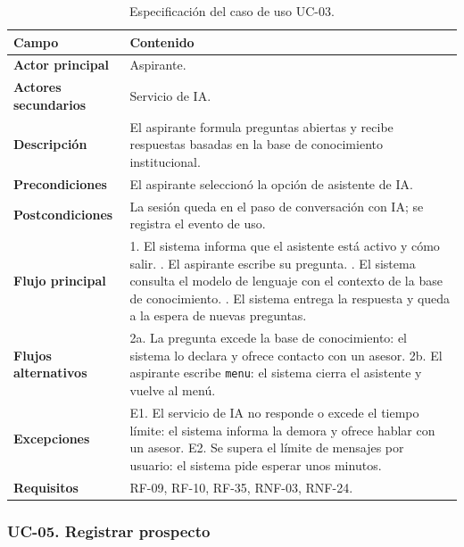 \documentclass[12pt,a4paper]{report}
\newcommand{\tablacompacta}{\setstretch{1.1}\small}
\newcommand{\cabecera}[1]{\rowcolor{filacabecera}#1}
\begin{document}
\begin{table}[H]
    \centering
    \tablacompacta
    \begin{tabularx}{\textwidth}{p{3.2cm}X}
        \toprule
        \cabecera{\textbf{Campo}} & \textbf{Contenido} \\
        \midrule
        \textbf{Actor principal} & Aspirante. \\
        \textbf{Actores secundarios} & Servicio de IA. \\
        \textbf{Descripción} & El aspirante formula preguntas abiertas y recibe respuestas basadas en la base de conocimiento institucional. \\
        \textbf{Precondiciones} & El aspirante seleccionó la opción de asistente de IA. \\
        \textbf{Postcondiciones} & La sesión queda en el paso de conversación con IA; se registra el evento de uso. \\
        \textbf{Flujo principal} &
        1. El sistema informa que el asistente está activo y cómo salir. \newline
        2. El aspirante escribe su pregunta. \newline
        3. El sistema consulta el modelo de lenguaje con el contexto de la base de conocimiento. \newline
        4. El sistema entrega la respuesta y queda a la espera de nuevas preguntas. \\
        \textbf{Flujos alternativos} &
        2a. La pregunta excede la base de conocimiento: el sistema lo declara y ofrece contacto con un asesor. \newline
        2b. El aspirante escribe \texttt{menu}: el sistema cierra el asistente y vuelve al menú. \\
        \textbf{Excepciones} &
        E1. El servicio de IA no responde o excede el tiempo límite: el sistema informa la demora y ofrece hablar con un asesor. \newline
        E2. Se supera el límite de mensajes por usuario: el sistema pide esperar unos minutos. \\
        \textbf{Requisitos} & RF-09, RF-10, RF-35, RNF-03, RNF-24. \\
        \bottomrule
    \end{tabularx}
    \caption{Especificación del caso de uso UC-03.}
\end{table}

\subsubsection{UC-05. Registrar prospecto}
\end{document}
